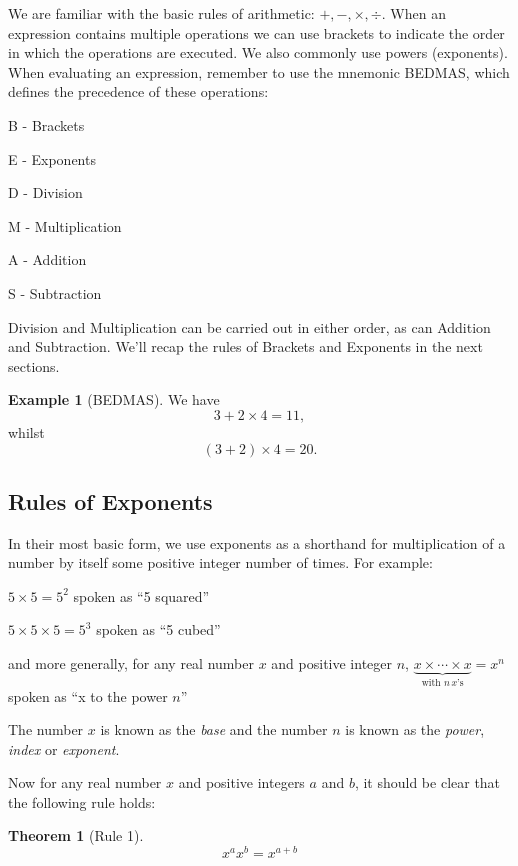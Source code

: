 \documentclass[
]{book}
\newtheorem{theorem}{Theorem}[chapter]
\theoremstyle{definition}
\theoremstyle{definition}
\newtheorem{example}{Example}[chapter]
\theoremstyle{definition}
\theoremstyle{definition}
\theoremstyle{remark}
\begin{document}
We are familiar with the basic rules of arithmetic: \(+, -, \times, \div\). When an expression contains multiple operations we can use brackets to indicate the order in which the operations are executed. We also commonly use powers (exponents). When evaluating an expression, remember to use the mnemonic BEDMAS, which defines the precedence of these operations:

B - Brackets

E - Exponents

D - Division

M - Multiplication

A - Addition

S - Subtraction

Division and Multiplication can be carried out in either order, as can Addition and Subtraction. We'll recap the rules of Brackets and Exponents in the next sections.

\begin{example}[BEDMAS]
\protect\hypertarget{exm:BEDMAS}{}\label{exm:BEDMAS}We have
\[3+2\times 4=11,\]
whilst
\[(3+2)\times 4 = 20.\]
\end{example}

\hypertarget{exponents}{%
\subsection{Rules of Exponents}\label{exponents}}

In their most basic form, we use exponents as a shorthand for multiplication of a number by itself some positive integer number of times. For example:

\(5\times 5 = 5^2\) spoken as ``5 squared''

\(5\times 5\times 5=5^3\) spoken as ``5 cubed''

and more generally, for any real number \(x\) and positive integer \(n\),
\(\underbrace{x\times \dotsb \times x}_{\text{with }n\, x\text{'s}} = x^n\) spoken as ``x to the power \(n\)''

The number \(x\) is known as the \emph{base} and the number \(n\) is known as the \emph{power}, \emph{index} or \emph{exponent}.

Now for any real number \(x\) and positive integers \(a\) and \(b\), it should be clear that the following rule holds:

\begin{theorem}[Rule 1]
\protect\hypertarget{thm:exprule1}{}\label{thm:exprule1}\[x^ax^b=x^{a+b}\]
\end{theorem}
\end{document}

